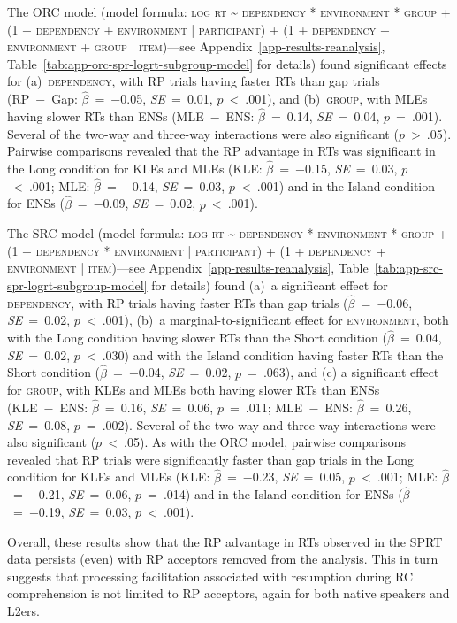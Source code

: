 The ORC model (model formula: \textsc{log rt \~{} dependency * environment * group + (1 + dependency + environment | participant) + (1 + dependency + environment + group | item)}---see Appendix~\ref{app-results-reanalysis}, Table~\ref{tab:app-orc-spr-logrt-subgroup-model} for details) found significant effects for (a)~\textsc{dependency}, with RP trials having faster RTs than gap trials (RP~−~Gap: $\hat{\beta}$~=~−0.05, \textit{SE}~=~0.01, $p$~<~.001), and (b)~\textsc{group}, with MLEs having slower RTs than ENSs (MLE~−~ENS: $\hat{\beta}$~=~0.14, \textit{SE}~=~0.04, $p$~=~.001). Several of the two-way and three-way interactions were also significant ($p$~>~.05). Pairwise comparisons revealed that the RP advantage in RTs was significant in the Long condition for KLEs and MLEs (KLE: $\hat{\beta}$~=~−0.15, \textit{SE}~=~0.03, $p$~<~.001; MLE: $\hat{\beta}$~=~−0.14, \textit{SE}~=~0.03, $p$~<~.001) and in the Island condition for ENSs ($\hat{\beta}$~=~−0.09, \textit{SE}~=~0.02, $p$~<~.001).

The SRC model (model formula: \textsc{log rt \~{} dependency * environment * group + (1 + dependency * environment | participant) + (1 + dependency + environment | item)}---see Appendix~\ref{app-results-reanalysis}, Table~\ref{tab:app-src-spr-logrt-subgroup-model} for details) found (a)~a significant effect for \textsc{dependency}, with RP trials having faster RTs than gap trials ($\hat{\beta}$~=~−0.06, \textit{SE}~=~0.02, $p$~<~.001), (b)~a marginal-to-significant effect for \textsc{environment}, both with the Long condition having slower RTs than the Short condition ($\hat{\beta}$~=~0.04, \textit{SE}~=~0.02, $p$~<~.030) and with the Island condition having faster RTs than the Short condition ($\hat{\beta}$~=~−0.04, \textit{SE}~=~0.02, $p$~=~.063), and (c) a significant effect for \textsc{group}, with KLEs and MLEs both having slower RTs than ENSs (KLE~−~ENS: $\hat{\beta}$~=~0.16, \textit{SE}~=~0.06, $p$~=~.011; MLE~−~ENS: $\hat{\beta}$~=~0.26, \textit{SE}~=~0.08, $p$~=~.002). Several of the two-way and three-way interactions were also significant ($p$~<~.05). As with the ORC model, pairwise comparisons revealed that RP trials were significantly faster than gap trials in the Long condition for KLEs and MLEs (KLE: $\hat{\beta}$~=~−0.23, \textit{SE}~=~0.05, $p$~<~.001; MLE: $\hat{\beta}$~=~−0.21, \textit{SE}~=~0.06, $p$~=~.014) and in the Island condition for ENSs ($\hat{\beta}$~=~−0.19, \textit{SE}~=~0.03, $p$~<~.001).

Overall, these results show that the RP advantage in RTs observed in the SPRT data persists (even) with RP acceptors removed from the analysis. This in turn suggests that processing facilitation associated with resumption during RC comprehension is not limited to RP acceptors, again for both native speakers and L2ers. 

